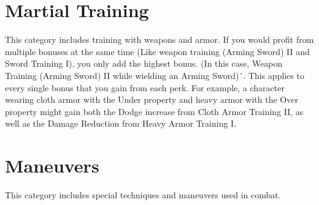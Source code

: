 \chapter{Martial Training}\label{ch:martialTraining}
This category includes training with weapons and armor.
If you would profit from multiple bonuses at the same time (Like weapon training (Arming Sword) II and Sword Training I), you only add the highest bonus.
(In this case, Weapon Training (Arming Sword) II while wielding an Arming Sword)´.
This applies to every single bonus that you gain from each perk.
For example, a character wearing cloth armor with the Under property and heavy armor with the Over property might gain both the Dodge increase from Cloth Armor Training II, as well as the Damage Reduction from Heavy Armor Training I.

	

	

	

	
	
	

	

	

	

	

	

	

	

	

	

	

\chapter{Maneuvers}\label{ch:maneuvers}
This category includes special techniques and maneuvers used in combat.

	

	

	

	
	
	

	

	
	
	